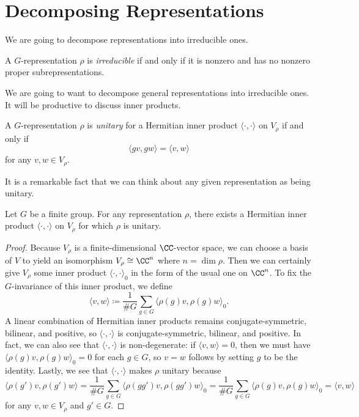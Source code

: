 \documentclass[../main.tex]{subfiles}
\begin{document}
\section{Decomposing Representations}
We are going to decompose representations into irreducible ones.
\begin{definition}[irreducible]
	A $G$-representation $\rho$ is \textit{irreducible} if and only if it is nonzero and has no nonzero proper subrepresentations.
\end{definition}
We are going to want to decompose general representations into irreducible ones. It will be productive to discuss inner products.
\begin{definition}[unitary]
	A $G$-representation $\rho$ is \textit{unitary} for a Hermitian inner product $\langle\cdot,\cdot\rangle$ on $V_\rho$ if and only if
	\[\langle gv,gw\rangle=\langle v,w\rangle\]
	for any $v,w\in V_\rho$.
\end{definition}
It is a remarkable fact that we can think about any given representation as being unitary.
\begin{proposition}[Weyl] \label{prop:make-unitary}
	Let $G$ be a finite group. For any representation $\rho$, there exists a Hermitian inner product $\langle\cdot,\cdot\rangle$ on $V_\rho$ for which $\rho$ is unitary.
\end{proposition}
\begin{proof}
	Because $V_\rho$ is a finite-dimensional $\CC$-vector space, we can choose a basis of $V$ to yield an isomorphism $V_\rho\cong\CC^n$ where $n=\dim\rho$. Then we can certainly give $V_\rho$ some inner product $\langle\cdot,\cdot\rangle_0$ in the form of the usual one on $\CC^n$. To fix the $G$-invariance of this inner product, we define
	\[\langle v,w\rangle\coloneqq\frac1{\#G}\sum_{g\in G}\langle\rho(g)v,\rho(g)w\rangle_0.\]
	A linear combination of Hermitian inner products remains conjugate-symmetric, bilinear, and positive, so $\langle\cdot,\cdot\rangle$ is conjugate-symmetric, bilinear, and positive. In fact, we can also see that $\langle\cdot,\cdot\rangle$ is non-degenerate: if $\langle v,w\rangle=0$, then we must have $\langle\rho(g)v,\rho(g)w\rangle_0=0$ for each $g\in G$, so $v=w$ follows by setting $g$ to be the identity. Lastly, we see that $\langle\cdot,\cdot\rangle$ makes $\rho$ unitary because
	\[\langle\rho(g')v,\rho(g')w\rangle=\frac1{\#G}\sum_{g\in G}\langle\rho(gg')v,\rho(gg')w\rangle_0=\frac1{\#G}\sum_{g\in G}\langle\rho(g)v,\rho(g)w\rangle_0=\langle v,w\rangle\]
	for any $v,w\in V_\rho$ and $g'\in G$.
\end{proof}
\end{document}
